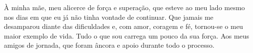 À minha mãe, meu alicerce de força e superação, que esteve ao meu lado mesmo nos dias em que eu já não tinha vontade de continuar. Que jamais me desamparou diante das dificuldades e, com amor, coragem e fé, tornou-se o meu maior exemplo de vida. Tudo o que sou carrega um pouco da sua força.
Aos meus amigos de jornada, que foram âncora e apoio durante todo o processo.